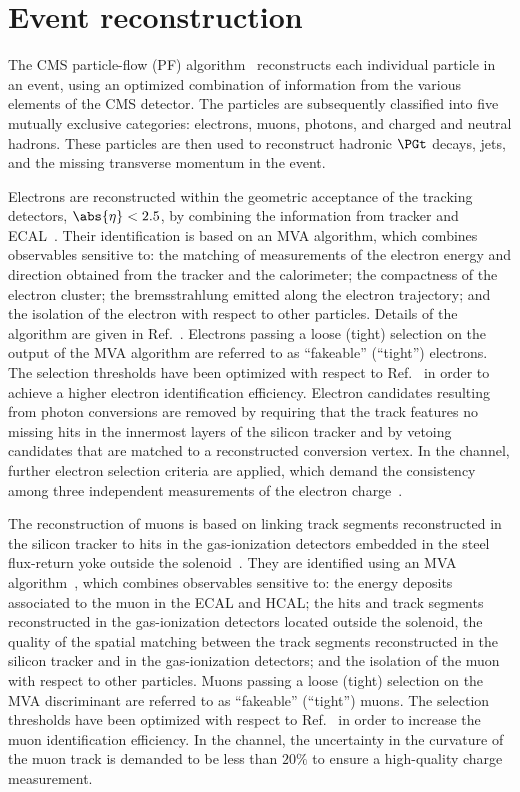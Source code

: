 \section{Event reconstruction}
\label{sec:eventReconstruction}

The CMS particle-flow (PF) algorithm~\cite{Sirunyan:2017ulk} reconstructs each individual particle in an event,
using an optimized combination of information from the various elements of the CMS detector.
The particles are subsequently classified into five mutually exclusive categories: 
electrons, muons, photons, and charged and neutral hadrons.
These particles are then used to reconstruct hadronic $\PGt$ decays, jets, and the missing transverse momentum in the event.

Electrons are reconstructed within the geometric acceptance of the tracking detectors, $\abs{\eta} < 2.5$,
by combining the information from tracker and ECAL~\cite{Khachatryan:2015hwa}.
Their identification is based on an MVA algorithm, which combines observables sensitive 
to: the matching of measurements of the electron energy and direction obtained from the tracker and the calorimeter;
the compactness of the electron cluster;
the bremsstrahlung emitted along the electron trajectory;
and the isolation of the electron with respect to other particles.
Details of the algorithm are given in Ref.~\cite{Sirunyan:2020icl}.
Electrons passing a loose (tight) selection on the output of the MVA algorithm are referred to as ``fakeable'' (``tight'') electrons.
The selection thresholds have been optimized with respect to Ref.~\cite{Sirunyan:2020icl} in order to achieve a higher electron identification efficiency.
Electron candidates resulting from photon conversions are removed by requiring 
that the track features no missing hits in the innermost layers of the silicon tracker and by vetoing candidates that are matched to a reconstructed conversion vertex.
In the \twoLeptonssZeroTau channel, further electron selection criteria are applied,
which demand the consistency among three independent measurements of the electron charge~\cite{Khachatryan:2015hwa}.

The reconstruction of muons is based on linking track segments reconstructed in the silicon tracker 
to hits in the gas-ionization detectors embedded in the steel flux-return yoke outside the solenoid~\cite{Sirunyan:2018}.
They are identified using an MVA algorithm~\cite{Sirunyan:2020icl}, which combines observables sensitive 
to: the energy deposits associated to the muon in the ECAL and HCAL;
the hits and track segments reconstructed in the gas-ionization detectors located outside the solenoid,
the quality of the spatial matching between the track segments reconstructed in the silicon tracker and in the gas-ionization detectors;
and the isolation of the muon with respect to other particles.
Muons passing a loose (tight) selection on the MVA discriminant are referred to as ``fakeable'' (``tight'') muons.
The selection thresholds have been optimized with respect to Ref.~\cite{Sirunyan:2020icl} in order to increase the muon identification efficiency.
In the \twoLeptonssZeroTau channel, the uncertainty in the curvature of the muon track is demanded to be less than $20\%$
to ensure a high-quality charge measurement.

